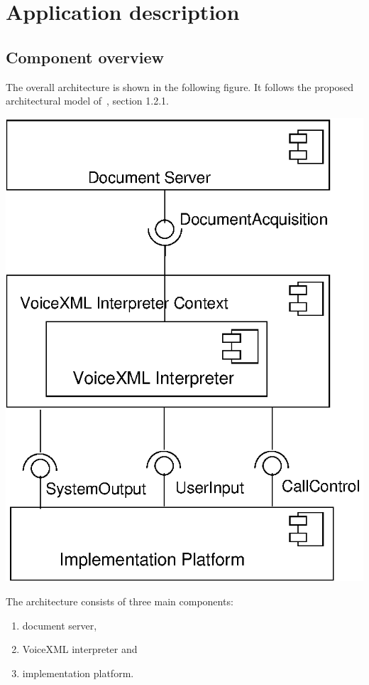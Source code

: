 \documentclass[11pt,a4paper]{article}
\begin{document}
\section{Application description}
\label{sec:appl-descr}

\subsection{Component overview}
\label{sec:component-overview}

The overall architecture is shown in the following figure.
It follows the proposed architectural model of~\cite{w3.org:voicexml}, 
section 1.2.1. 
\begin{center}
\includegraphics{overview}
\end{center}

The architecture consists of three main components:
\begin{enumerate}
\item document server,
\item VoiceXML interpreter and
\item implementation platform.
\end{enumerate}
\end{document}
